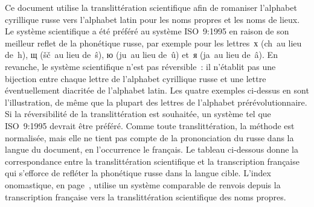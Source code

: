 Ce document utilise la translittération scientifique afin de romaniser
l'alphabet cyrillique russe vers l'alphabet latin pour les noms propres et
les noms de lieux.
Le système scientifique a été préféré au système ISO~9:1995 en raison de son
meilleur reflet de la phonétique russe, par exemple pour les lettres~х
(ch~au lieu de~h), щ (šč~au lieu de~ŝ), ю (ju~au lieu de~û) et~я (ja~au lieu
de~â).
En revanche, le système scientifique n'est pas réversible~: il n'établit pas
une bijection entre chaque lettre de l'alphabet cyrillique russe et une
lettre éventuellement diacritée de l'alphabet latin.
Les quatre exemples ci-dessus en sont l'illustration, de même que la plupart
des lettres de l'alphabet pré\-révolutionnaire.
Si la réversibilité de la translittération est souhaitée, un système tel que
ISO~9:1995 devrait être préféré.
Comme toute translittération, la méthode est normalisée, mais elle ne tient
pas compte de la prononciation du russe dans la langue du document, en
l'occurrence le français.
Le tableau ci-dessous donne la correspondance entre la translittération
scientifique et la transcription française qui s'efforce de refléter la
phonétique russe dans la langue cible.
L'index onomastique, en page~\pageref{chap:Indexonomastique}, utilise un
système comparable de renvois depuis la transcription française vers la
translittération scientifique des noms propres.

